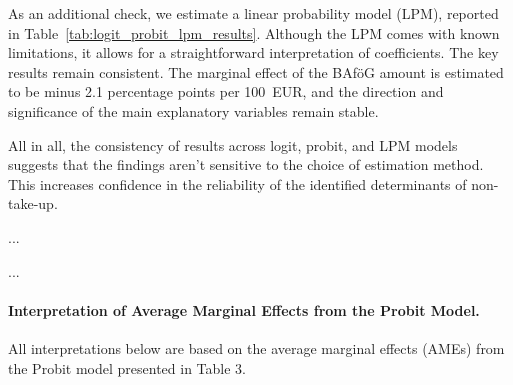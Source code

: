 As an additional check, we estimate a linear probability model (LPM), reported in Table~\ref{tab:logit_probit_lpm_results}. 
Although the LPM comes with known limitations, it allows for a straightforward interpretation of coefficients. 
The key results remain consistent. The marginal effect of the BAföG amount is estimated to be minus 2.1 percentage points per 100~EUR, and the direction and significance of the main explanatory variables remain stable.



All in all, the consistency of results across logit, probit, and LPM models suggests that the findings aren't sensitive to the choice of estimation method. This increases confidence in the reliability of the identified determinants of non-take-up.


...






...

\paragraph{Interpretation of Average Marginal Effects from the Probit Model.} All interpretations below are based on the average marginal effects (AMEs) from the Probit model presented in Table 3.

